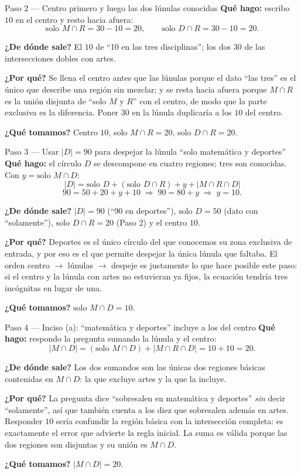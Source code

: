 \documentclass[11pt]{article}
\begin{document}
\begin{paso}{Paso 2 --- Centro primero y luego las dos lúnulas conocidas}
\textbf{Qué hago:} escribo $10$ en el centro y resto hacia afuera:
\[
\text{solo }M\cap R = 30-10 = 20,
\qquad
\text{solo }D\cap R = 30-10 = 20 .
\]

\textbf{¿De dónde sale?} El $10$ de ``10 en las tres disciplinas''; los dos $30$ de las intersecciones
dobles con artes.

\textbf{¿Por qué?} Se llena el centro antes que las lúnulas porque el dato ``las tres'' es el único que
describe una región sin mezclar; y se resta hacia afuera porque $M\cap R$ es la unión disjunta de
``solo $M$ y $R$'' con el centro, de modo que la parte exclusiva es la diferencia. Poner $30$ en la lúnula
duplicaría a los $10$ del centro.

\textbf{¿Qué tomamos?} Centro $10$, solo $M\cap R=20$, solo $D\cap R=20$.
\end{paso}

\begin{paso}{Paso 3 --- Usar $|D|=90$ para despejar la lúnula ``solo matemática y deportes''}
\textbf{Qué hago:} el círculo $D$ se descompone en cuatro regiones; tres son conocidas. Con
$y=\text{solo } M\cap D$:
\[
|D| = \text{solo }D + (\text{solo }D\cap R) + y + |M\cap R\cap D|
\]
\[
90 = 50 + 20 + y + 10 \;\Longrightarrow\; 90 = 80 + y \;\Longrightarrow\; y = 10 .
\]

\textbf{¿De dónde sale?} $|D|=90$ (``90 en deportes''), $\text{solo }D=50$ (dato con ``solamente''),
$\text{solo }D\cap R=20$ (Paso 2) y el centro $10$.

\textbf{¿Por qué?} Deportes es el único círculo del que conocemos su zona exclusiva de entrada, y por eso
es el que permite despejar la única lúnula que faltaba. El orden centro $\to$ lúnulas $\to$ despeje es
justamente lo que hace posible este paso: si el centro y la lúnula con artes no estuvieran ya fijos, la
ecuación tendría tres incógnitas en lugar de una.

\textbf{¿Qué tomamos?} $\text{solo } M\cap D = 10$.
\end{paso}

\begin{paso}{Paso 4 --- Inciso (a): ``matemática y deportes'' incluye a los del centro}
\textbf{Qué hago:} respondo la pregunta sumando la lúnula y el centro:
\[
|M\cap D| = (\text{solo } M\cap D) + |M\cap R\cap D| = 10 + 10 = 20 .
\]

\textbf{¿De dónde sale?} Los dos sumandos son las únicas dos regiones básicas contenidas en $M\cap D$:
la que excluye artes y la que la incluye.

\textbf{¿Por qué?} La pregunta dice ``sobresalen en matemática y deportes'' \emph{sin} decir
``solamente'', así que también cuenta a los diez que sobresalen además en artes. Responder $10$ sería
confundir la región básica con la intersección completa: es exactamente el error que advierte la regla
inicial. La suma es válida porque las dos regiones son disjuntas y su unión es $M\cap D$.

\textbf{¿Qué tomamos?} $|M\cap D| = 20$.
\end{paso}
\end{document}

